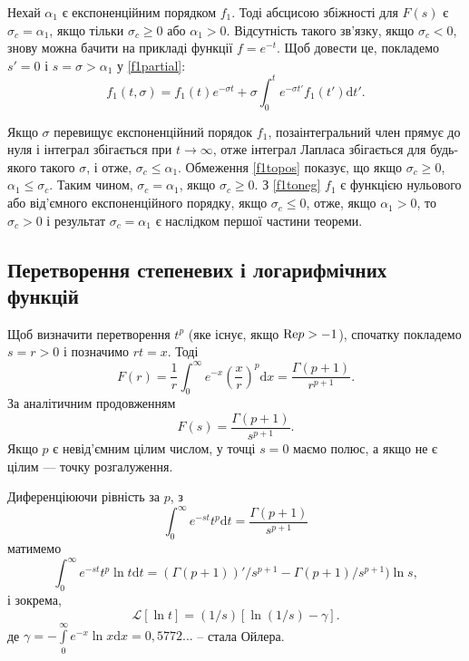 \documentclass[14pt,twoside]{extreport}
\theoremstyle{mystyle}
\numberwithin{equation}{chapter}
\begin{document}
Нехай $\alpha_{1}$ є експоненційним порядком $f_{1}$. Тоді абсцисою збіжності для $F(s)$ є $\sigma_{c}=\alpha_{1}$, якщо тільки $\sigma_{c}\geqslant 0$ або $\alpha_{1}>0$. Відсутність такого зв'язку, якщо $\sigma_{c}<0$, знову можна бачити на прикладі функції $f=e^{-t}$. Щоб довести це, покладемо $s'=0$ і $s=\sigma>\alpha_{1}$ у \eqref{f1partial}:
\begin{equation*}
	f_{1}(t,\displaystyle  \sigma)=f_{1}(t)e^{-\sigma t}+\sigma\int_{0}^{t}e^{-\sigma t'}f_{1}(t')\mathrm{d}t'.
\end{equation*}

Якщо $\sigma$ перевищує експоненційний порядок $f_{1}$, позаінтегральний член прямує до нуля і інтеграл збігається при $t\to \infty$, отже інтеграл Лапласа збігається для будь-якого такого $\sigma$, і отже, $\sigma_{c}\leqslant\alpha_{1}$. Обмеження \eqref{f1topos} показує, що якщо $\sigma_{c}\geqslant 0$, $\alpha_{1}\leqslant\sigma_{c}$. Таким чином, $\sigma_{c}=\alpha_{1}$, якщо $\sigma_{c}\geqslant 0$. З \eqref{f1toneg} $f_{1}$ є функцією нульового або від'ємного експоненційного порядку, якщо $\sigma_{c}\leqslant 0$, отже, якщо $\alpha_{1}>0$, то $\sigma_{c}>0$ і результат $\sigma_{c}=\alpha_{1}$ є наслідком першої частини теореми.

\subsection{Перетворення степеневих і логарифмічних функцій}

Щоб визначити перетворення $t^{p}$ (яке існує, якщо ${\rm Re} p>-1$), спочатку покладемо $s=r>0$ і позначимо $rt=x$. Тоді
\begin{equation*}
	\displaystyle F(r)=\dfrac{1}{r}\int_{0}^{\infty}e^{-x} \left(\dfrac{x}{r}\right)^{p}\mathrm{d}x=\dfrac{\Gamma(p+1)}{r^{p+1}}.
\end{equation*}
За аналітичним продовженням
\begin{equation*}
	F(s)=\dfrac{\Gamma(p+1)}{s^{p+1}}.
\end{equation*}
Якщо $p$ є невід'ємним цілим числом, у точці $s=0$ маємо полюс, а якщо не є цілим — точку розгалуження.

Диференціюючи рівність за $p$, з
\begin{equation*}
	\displaystyle \int_{0}^{\infty}e^{-st}t^{p}\mathrm{d}t = \dfrac{\Gamma(p+1)}{s^{p+1}}
\end{equation*}
матимемо
\begin{equation*}
	\displaystyle \int_{0}^{\infty}e^{-st}t^{p}\ln t\mathrm{d}t=(\Gamma(p+1))'/s^{p+1}-\Gamma(p+1)/s^{p+1})\ln s,
\end{equation*}
і зокрема,
\begin{equation*}
	\mathcal{L}[\ln t]=(1/s)[\ln(1/s)-\gamma].
\end{equation*}
де $\gamma = -\int\limits_{0}^{\infty} e^{-x} \ln x \mathrm{d}x = 0,5772\ldots$ -- стала Ойлера.
\end{document}
